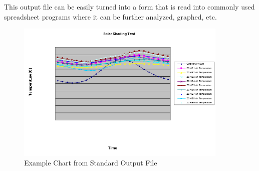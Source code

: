 This output file can be easily turned into a form that is read into commonly used spreadsheet programs where it can be further analyzed, graphed, etc.

\begin{figure}[hbtp] %
\centering
\includegraphics[width=0.9\textwidth, height=0.9\textheight, keepaspectratio=true]{media/image003.png}
\caption{  Example Chart from Standard Output File \protect \label{fig:example-chart-from-standard-output-file}}
\end{figure}
